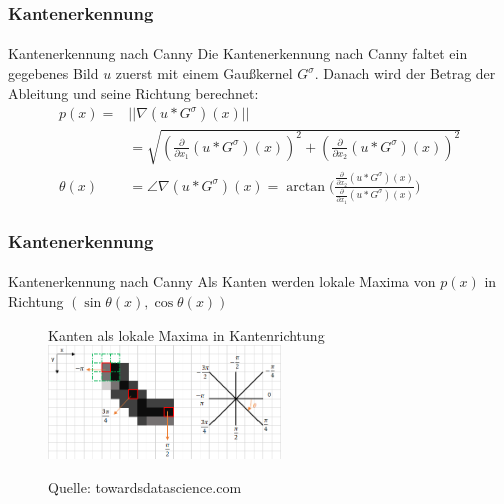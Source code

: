 \documentclass{beamer}
\begin{document}
\begin{frame}
    \frametitle{Kantenerkennung}
\framesubtitle{}

\begin{block}{Kantenerkennung nach Canny}
Die Kantenerkennung nach Canny faltet ein gegebenes Bild $u$ zuerst mit einem Gaußkernel $G^{\sigma}$. Danach wird  der Betrag der Ableitung und seine Richtung berechnet: 
\begin{align*}
p(x) = & || \nabla (u * G^\sigma)(x) || \\
&= \sqrt{ (\frac{\partial}{\partial x_1} (u * G^\sigma)(x))^2 + (\frac{\partial}{\partial x_2} (u * G^\sigma)(x))^2 } \\
\theta(x) & = \angle  \nabla (u * G^\sigma)(x) = \arctan \biggl( \frac{\frac{\partial}{\partial x_2} (u * G^\sigma)(x)}{\frac{\partial}{\partial x_1} (u * G^\sigma)(x)} \biggr)
\end{align*}


 \end{block}

 \end{frame}



\begin{frame}
    \frametitle{Kantenerkennung}
\framesubtitle{}
\begin{block}{Kantenerkennung nach Canny}
Als Kanten werden lokale Maxima von $p(x)$ in Richtung $(\sin \theta(x), \cos \theta(x)  )$
\end{block}
\begin{figure}[htp]
      \centering
Kanten als lokale Maxima in Kantenrichtung \\
    \includegraphics[width=0.55\textwidth]{img/canny_max} 
      \caption{Quelle: towardsdatascience.com}
\end{figure}

 \end{frame}
\end{document}
